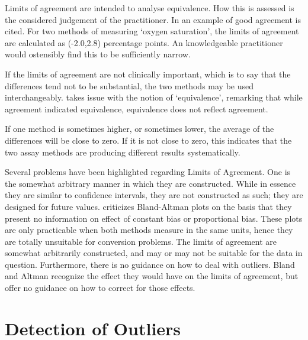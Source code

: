 \documentclass[12pt, a4paper]{report}
\theoremstyle{plain}
\theoremstyle{definition}
\theoremstyle{remark}
\begin{document}
Limits of agreement are intended to analyse equivalence. How this is assessed is the considered judgement of the practitioner. In \citet{BA86} an example of good agreement is cited. For two
methods of measuring `oxygen saturation', the limits of agreement are calculated as (-2.0,2.8) percentage points. An knowledgeable practitioner would ostensibly find
this to be sufficiently narrow.

If the limits of agreement are not clinically important, which is
to say that the differences tend not to be substantial, the two
methods may be used interchangeably. \citet{DunnSEME} takes issue
with the notion of `equivalence', remarking that while agreement
indicated equivalence, equivalence does not reflect agreement.

%
%


If one method is sometimes higher, or sometimes lower, the average of the differences will be close to zero.
If it is not close to zero, this indicates that the two assay methods are producing different results systematically.

Several problems have been highlighted regarding Limits of Agreement. One is the somewhat arbitrary manner in which they are
constructed. While in essence they are similar to confidence intervals, they are not constructed as such; they are designed for future values.
\citet{ludbrook97,ludbrook02} criticizes Bland-Altman plots on the
basis that they present no information on effect of constant bias
or proportional bias. These plots are only practicable when both
methods measure in the same units, hence they are totally
unsuitable for conversion problems. The limits of agreement are
somewhat arbitrarily constructed, and may or may not be suitable
for the data in question. Furthermore, there is no guidance on how to deal
with outliers. Bland and Altman recognize the effect they would have
on the limits of agreement, but offer no guidance on how to
correct for those effects.	


\section{Detection of Outliers}
\end{document}
